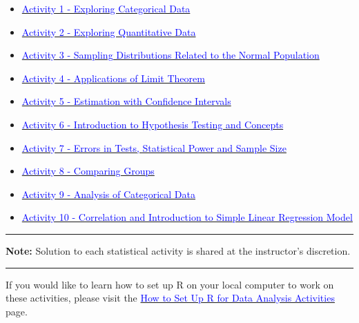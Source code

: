 \documentclass[oneside,openany]{book}
\providecommand{\tightlist}{%
  \setlength{\itemsep}{0pt}\setlength{\parskip}{0pt}}
\begin{document}
\begin{itemize}
\tightlist
\item
  \hyperref[activity-1---exploring-categorical-data]{\textcolor{blue}{Activity 1 - Exploring Categorical Data}}
\item
  \hyperref[activity-2---exploring-quantitative-data]{\textcolor{blue}{Activity 2 - Exploring Quantitative Data}}
\item
  \hyperref[activity-3---sampling-distributions-related-to-the-normal-population]{\textcolor{blue}{Activity 3 - Sampling Distributions Related to the Normal Population}}
\item
  \hyperref[activity-4---applications-of-limit-theorem]{\textcolor{blue}{Activity 4 - Applications of Limit Theorem}}
\item
  \hyperref[activity-5---estimation-with-confidence-intervals]{\textcolor{blue}{Activity 5 - Estimation with Confidence Intervals}}
\item
  \hyperref[activity-6---introduction-to-hypothesis-testing-and-concepts]{\textcolor{blue}{Activity 6 - Introduction to Hypothesis Testing and Concepts}}
\item
  \hyperref[activity-7---errors-in-tests-statistical-power-and-sample-size]{\textcolor{blue}{Activity 7 - Errors in Tests, Statistical Power and Sample Size}}
\item
  \hyperref[activity-8---comparing-groups]{\textcolor{blue}{Activity 8 - Comparing Groups}}
\item
  \hyperref[activity-9---analysis-of-categorical-data]{\textcolor{blue}{Activity 9 - Analysis of Categorical Data}}
\item
  \hyperref[activity-10---correlation-and-introduction-to-simple-linear-regression-model]{\textcolor{blue}{Activity 10 - Correlation and Introduction to Simple Linear Regression Model}}
\end{itemize}


\begin{center}\rule{0.5\linewidth}{0.5pt}\end{center}

\textbf{Note:} Solution to each statistical activity is shared at the instructor's discretion.

\begin{center}\rule{0.5\linewidth}{0.5pt}\end{center}

If you would like to learn how to set up R on your local computer to work on these activities, please visit the \hyperref[how-to-set-up-r-for-data-analysis-activities]{\textcolor{blue}{How to Set Up R for Data Analysis Activities}} page.
\end{document}
